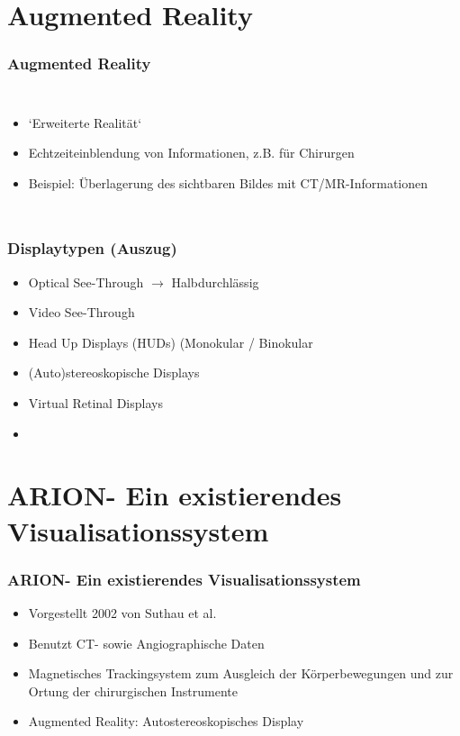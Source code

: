 \documentclass[14pt]{beamer}
\begin{document}
\section{Augmented Reality}
\begin{frame}[allowframebreaks]
\frametitle{Augmented Reality}
\begin{columns}
	    \begin{itemize}
	    \item `Erweiterte Realität`
	    \item Echtzeiteinblendung von Informationen, z.B. für Chirurgen
	    \item Beispiel: Überlagerung des sichtbaren Bildes mit CT/MR-Informationen
	    \end{itemize}
\end{columns}
\end{frame}

\begin{frame}
\frametitle{Displaytypen (Auszug)}
\begin{itemize}
 \item Optical See-Through $\rightarrow$ Halbdurchlässig
 \item Video See-Through
 \item Head Up Displays (HUDs) (Monokular / Binokular
 \item (Auto)stereoskopische Displays
 \item Virtual Retinal Displays
 \item 
\end{itemize}


\end{frame}
%
%
\section{ARION\texttrademark - Ein existierendes Visualisationssystem}
\begin{frame}
\frametitle{ARION\texttrademark - Ein existierendes Visualisationssystem}
\begin{itemize}
\item Vorgestellt 2002 von Suthau et al.
\item Benutzt CT- sowie Angiographische Daten
\item Magnetisches Trackingsystem zum Ausgleich der Körperbewegungen und zur Ortung der chirurgischen Instrumente
\item Augmented Reality: Autostereoskopisches Display
\end{itemize}
\end{frame}
\end{document}
